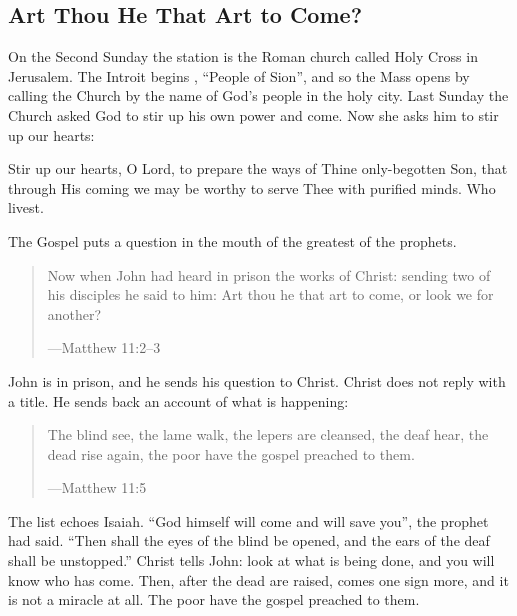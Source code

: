 \subsection{Art Thou He That Art to Come?}\label{sec:second-week}

On the Second Sunday the station is the Roman church called Holy Cross in
Jerusalem. The Introit begins , ``People of Sion'', and so
the Mass opens by calling the Church by the name of God's people in the holy
city. Last Sunday the Church asked God to stir up his own power and come. Now
she asks him to stir up our hearts:

\begin{studyframe}
\medskip

Stir up our hearts, O Lord, to prepare the ways of Thine only-begotten Son,
that through His coming we may be worthy to serve Thee with purified
minds. Who livest.\par
\end{studyframe}

The Gospel puts a question in the mouth of the greatest of the prophets.

\begin{quote}
Now when John had heard in prison the works of Christ: sending two of his
disciples he said to him: Art thou he that art to come, or look we for
another?\par
{\smallskip\noindent\small ---Matthew 11:2--3\par}
\end{quote}

John is in prison, and he sends his question to Christ. Christ does not reply
with a title. He sends back an account of what is happening:

\begin{quote}
The blind see, the lame walk, the lepers are cleansed, the deaf hear, the dead
rise again, the poor have the gospel preached to them.\par
{\smallskip\noindent\small ---Matthew 11:5\par}
\end{quote}

The list echoes Isaiah. ``God himself will come and will save you'', the
prophet had said. ``Then shall the eyes of the blind be opened, and the ears of
the deaf shall be unstopped.'' Christ tells John: look at what is being done,
and you will know who has come. Then, after the dead are raised, comes one
sign more, and it is not a miracle at all. The poor have the gospel preached to
them.


